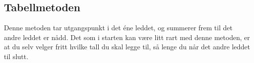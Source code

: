 \subsection{Tabellmetoden}
Denne metoden tar utgangspunkt i det éne leddet, og summerer frem til det andre leddet er nådd. Det som i starten kan være litt rart med denne metoden, er at du selv velger fritt hvilke tall du skal legge til, så lenge du når det andre leddet til slutt.
\begin{center}
	\parbox{0.3\linewidth}{
	} \qquad
	\parbox{0.3\linewidth}{
	}
\end{center}
\newpage
